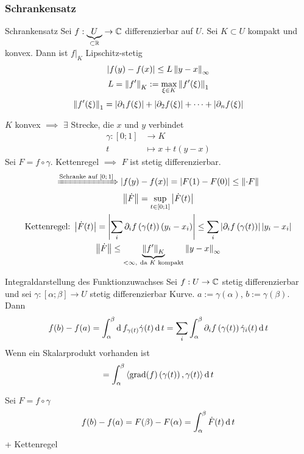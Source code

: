 \subsubsection{Schrankensatz}
\begin{Sat}{Schrankensatz}
  Sei $f:\underbrace{U}_{\subset\mathbb{R}}\to \mathbb{C}$ differenzierbar auf $U$. Sei $K\subset U$ kompakt und konvex. Dann ist $f|_K$ Lipschitz-stetig
  \[\left| f(y)-f(x) \right|\leq L\left\| y-x \right\|_\infty\]
  \[L=\left\| f' \right\|_K:=\max_{\xi\in K}\left\| f'(\xi) \right\|_1\]
  \[\left\| f'(\xi) \right\|_1=\left| \partial_1f(\xi) \right|+\left| \partial_2f(\xi) \right|+\cdots+\left| \partial_n f(\xi) \right|\]
\end{Sat}
\begin{Bew}
  $K$ konvex $\implies$ $\exists$ Strecke, die $x$ und $y$ verbindet
  \begin{align*}
    \gamma:[0;1]&\to K\\
    t&\mapsto x+t(y-x)
  \end{align*}
  Sei $F=f\circ \gamma$. Kettenregel $\implies$ $F$ ist stetig differenzierbar.
  \begin{gather*}
    \xRightarrow{\text{Schranke auf $[0;1]$}} \left| f(y)-f(x) \right|=\left| F(1)-F(0) \right|\leq \left\| \cdot F \right\|\\
    \left\| \dot F \right\|=\sup_{t\in[0;1]}\left| \dot F(t) \right|\\
    \text{Kettenregel:}\ \left| \dot F(t) \right|=\left| \sum_i\partial_if\left( \gamma(t) \right)(y_i-x_i) \right|\leq \sum_i\left| \partial_if\left( \gamma(t) \right) \right|\left| y_i-x_i \right|\\
    \left\| \dot F \right\|\leq \underbrace{\left\| f' \right\|_K}_{<\infty,\ \text{da $K$ kompakt}}\left\| y-x \right\|_\infty
  \end{gather*}
\end{Bew}
\begin{Sat}{Integraldarstellung des Funktionzuwachses}
  Sei $f:U\to\mathbb{C}$ stetig differenzierbar und sei $\gamma:[\alpha;\beta]\to U$ stetig differenzierbar Kurve. $a:=\gamma(\alpha)$, $b:=\gamma(\beta)$. Dann
  \[f(b)-f(a)=\int_\alpha^\beta\operatorname{d} f_{\gamma\left( t \right)}\dot \gamma(t)\operatorname{d} t=\sum_i\int^\beta_\alpha\partial_if\left( \gamma(t) \right)\dot\gamma_i(t)\operatorname{d} t\]
  Wenn ein Skalarprodukt vorhanden ist
  \[=\int^\beta_\alpha \left\langle \operatorname{grad}(f)\left( \gamma(t) \right), \gamma(t) \right\rangle \operatorname{d} t\]
\end{Sat}
\begin{Bew}
  Sei $F=f\circ \gamma$
  \begin{gather*}
    f(b)-f(a)=F(\beta)-F(\alpha)=\int^\beta_\alpha\dot F(t)\operatorname{d} t
  \end{gather*}
  + Kettenregel
\end{Bew}
